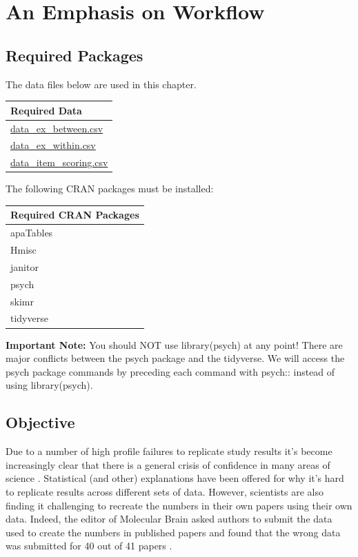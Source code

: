 \documentclass[
]{krantz}
\begin{document}
\hypertarget{an-emphasis-on-workflow}{%
\chapter{An Emphasis on Workflow}\label{an-emphasis-on-workflow}}

\hypertarget{required-packages}{%
\section{Required Packages}\label{required-packages}}

The data files below are used in this chapter.

\begin{longtable}[]{@{}l@{}}
\toprule
Required Data \\
\midrule
\endhead
\url{data_ex_between.csv} \\
\url{data_ex_within.csv} \\
\url{data_item_scoring.csv} \\
\bottomrule
\end{longtable}

The following CRAN packages must be installed:

\begin{longtable}[]{@{}l@{}}
\toprule
Required CRAN Packages \\
\midrule
\endhead
apaTables \\
Hmisc \\
janitor \\
psych \\
skimr \\
tidyverse \\
\bottomrule
\end{longtable}

\textbf{Important Note:} You should NOT use library(psych) at any point! There are major conflicts between the psych package and the tidyverse. We will access the psych package commands by preceding each command with psych:: instead of using library(psych).

\hypertarget{objective-1}{%
\section{Objective}\label{objective-1}}

Due to a number of high profile failures to replicate study results \citep{cos2015} it's become increasingly clear that there is a general crisis of confidence in many areas of science \citep{baker2016}. Statistical (and other) explanations have been offered \citep{simmons2011} for why it's hard to replicate results across different sets of data. However, scientists are also finding it challenging to recreate the numbers in their own papers using their own data. Indeed, the editor of Molecular Brain asked authors to submit the data used to create the numbers in published papers and found that the wrong data was submitted for 40 out of 41 papers \citep{miyakawa2020}.
\end{document}
